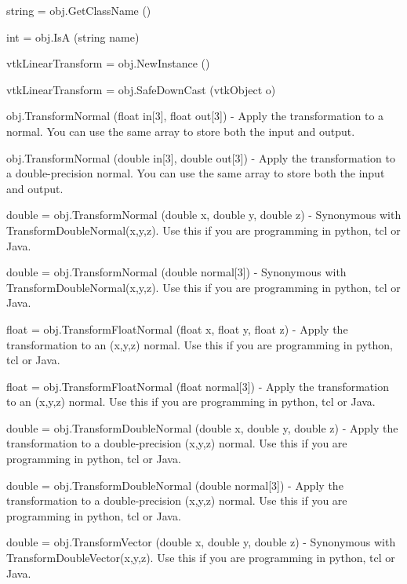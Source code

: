 \begin{DoxyItemize}
\item {\ttfamily string = obj.\-Get\-Class\-Name ()}  
\item {\ttfamily int = obj.\-Is\-A (string name)}  
\item {\ttfamily vtk\-Linear\-Transform = obj.\-New\-Instance ()}  
\item {\ttfamily vtk\-Linear\-Transform = obj.\-Safe\-Down\-Cast (vtk\-Object o)}  
\item {\ttfamily obj.\-Transform\-Normal (float in\mbox{[}3\mbox{]}, float out\mbox{[}3\mbox{]})} -\/ Apply the transformation to a normal. You can use the same array to store both the input and output.  
\item {\ttfamily obj.\-Transform\-Normal (double in\mbox{[}3\mbox{]}, double out\mbox{[}3\mbox{]})} -\/ Apply the transformation to a double-\/precision normal. You can use the same array to store both the input and output.  
\item {\ttfamily double = obj.\-Transform\-Normal (double x, double y, double z)} -\/ Synonymous with Transform\-Double\-Normal(x,y,z). Use this if you are programming in python, tcl or Java.  
\item {\ttfamily double = obj.\-Transform\-Normal (double normal\mbox{[}3\mbox{]})} -\/ Synonymous with Transform\-Double\-Normal(x,y,z). Use this if you are programming in python, tcl or Java.  
\item {\ttfamily float = obj.\-Transform\-Float\-Normal (float x, float y, float z)} -\/ Apply the transformation to an (x,y,z) normal. Use this if you are programming in python, tcl or Java.  
\item {\ttfamily float = obj.\-Transform\-Float\-Normal (float normal\mbox{[}3\mbox{]})} -\/ Apply the transformation to an (x,y,z) normal. Use this if you are programming in python, tcl or Java.  
\item {\ttfamily double = obj.\-Transform\-Double\-Normal (double x, double y, double z)} -\/ Apply the transformation to a double-\/precision (x,y,z) normal. Use this if you are programming in python, tcl or Java.  
\item {\ttfamily double = obj.\-Transform\-Double\-Normal (double normal\mbox{[}3\mbox{]})} -\/ Apply the transformation to a double-\/precision (x,y,z) normal. Use this if you are programming in python, tcl or Java.  
\item {\ttfamily double = obj.\-Transform\-Vector (double x, double y, double z)} -\/ Synonymous with Transform\-Double\-Vector(x,y,z). Use this if you are programming in python, tcl or Java.  

\end{DoxyItemize}
